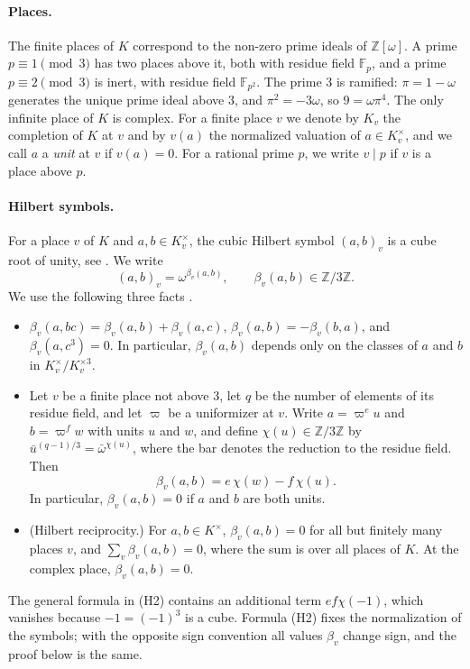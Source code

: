 \documentclass[11pt]{article}
\newcommand{\Z}{\mathbb{Z}}
\newcommand{\F}{\mathbb{F}}
\begin{document}
\paragraph{Places.} The finite places of $K$ correspond to the non-zero prime ideals of $\Z[\omega]$. A prime $p\equiv1\pmod3$ has two places above it, both with residue field $\F_p$, and a prime $p\equiv2\pmod3$ is inert, with residue field $\F_{p^2}$. The prime $3$ is ramified: $\pi=1-\omega$ generates the unique prime ideal above $3$, and $\pi^2=-3\omega$, so $9=\omega\pi^4$. The only infinite place of $K$ is complex. For a finite place $v$ we denote by $K_v$ the completion of $K$ at $v$ and by $v(a)$ the normalized valuation of $a\in K_v^\times$, and we call $a$ a \emph{unit} at $v$ if $v(a)=0$. For a rational prime $p$, we write $v\mid p$ if $v$ is a place above $p$.

\paragraph{Hilbert symbols.} For a place $v$ of $K$ and $a,b\in K_v^\times$, the cubic Hilbert symbol $(a,b)_v$ is a cube root of unity, see \cite[Chapter~V, \S3]{N}. We write
\[
(a,b)_v=\omega^{\beta_v(a,b)},\qquad\beta_v(a,b)\in\Z/3\Z.
\]
We use the following three facts \cite[Chapter~V, \S3 and Chapter~VI, \S8]{N}.
\begin{itemize}
\item[(H1)] $\beta_v(a,bc)=\beta_v(a,b)+\beta_v(a,c)$, $\beta_v(a,b)=-\beta_v(b,a)$, and $\beta_v(a,c^3)=0$. In particular, $\beta_v(a,b)$ depends only on the classes of $a$ and $b$ in $K_v^\times/K_v^{\times3}$.
\item[(H2)] Let $v$ be a finite place not above $3$, let $q$ be the number of elements of its residue field, and let $\varpi$ be a uniformizer at $v$. Write $a=\varpi^eu$ and $b=\varpi^fw$ with units $u$ and $w$, and define $\chi(u)\in\Z/3\Z$ by $\bar u^{(q-1)/3}=\bar\omega^{\chi(u)}$, where the bar denotes the reduction to the residue field. Then
\[
\beta_v(a,b)=e\,\chi(w)-f\,\chi(u).
\]
In particular, $\beta_v(a,b)=0$ if $a$ and $b$ are both units.
\item[(H3)] (Hilbert reciprocity.) For $a,b\in K^\times$, $\beta_v(a,b)=0$ for all but finitely many places $v$, and $\sum_v\beta_v(a,b)=0$, where the sum is over all places of $K$. At the complex place, $\beta_v(a,b)=0$.
\end{itemize}
The general formula in (H2) contains an additional term $ef\chi(-1)$, which vanishes because $-1=(-1)^3$ is a cube. Formula (H2) fixes the normalization of the symbols; with the opposite sign convention all values $\beta_v$ change sign, and the proof below is the same.
\end{document}
